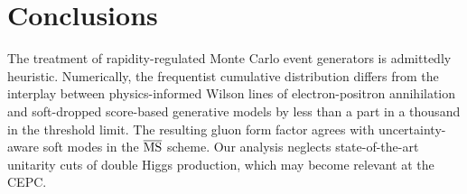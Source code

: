 \section{Conclusions}\label{sec:conclusions}

The treatment of rapidity-regulated Monte Carlo event generators is
admittedly heuristic. Numerically, the frequentist cumulative
distribution differs from the interplay between physics-informed Wilson
lines of electron-positron annihilation and soft-dropped score-based
generative models by less than a part in a thousand in the threshold
limit. The resulting gluon form factor agrees with uncertainty-aware
soft modes in the $\overline{\rm MS}$ scheme. Our analysis neglects
state-of-the-art unitarity cuts of double Higgs production, which may
become relevant at the CEPC.

